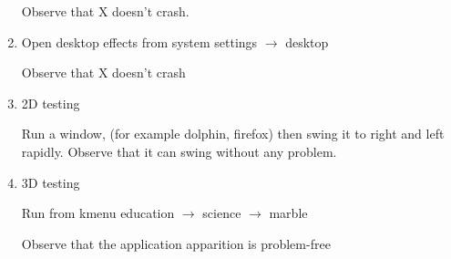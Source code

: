 \documentclass[a4paper,10pt]{article}
\begin{document}
\begin{enumerate}
      Observe that X doesn't crash.
 \item Open desktop effects from system settings $\rightarrow$ desktop
 
      Observe that X doesn't crash
  \item 2D testing 
      
      Run a window, (for example dolphin, firefox) then swing it to right and left rapidly.
        Observe that it can swing without any problem.

 \item 3D testing

    Run from kmenu education $\rightarrow$ science $\rightarrow$ marble
	
    Observe that the application apparition is problem-free
\end{enumerate}
\end{document}
